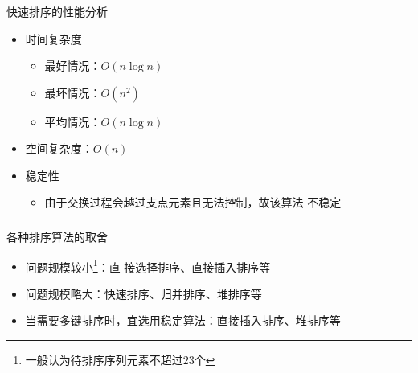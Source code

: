 \begin{frame}
    \frametitle{\insertsectionhead}
    \begin{block}{快速排序的性能分析}
        \begin{itemize}
            \item 时间复杂度
                  \begin{itemize}
                      \item 最好情况：$O(n\log n)$
                      \item 最坏情况：$O(n^{2})$
                      \item 平均情况：$O(n\log n)$
                  \end{itemize}
            \item 空间复杂度：$O(n)$
            \item 稳定性
                  \begin{itemize}
                      \item 由于交换过程会越过支点元素且无法控制，故该算法
                            \alert{不稳定}
                  \end{itemize}
        \end{itemize}
    \end{block}
\end{frame}

\begin{frame}
    \frametitle{\insertsectionhead}
    \begin{alertblock}{各种排序算法的取舍}
        \begin{itemize}
            \item 问题规模较小\footnote{一般认为待排序序列元素不超过$23$个}：直
                  接选择排序、直接插入排序等
            \item 问题规模略大：快速排序、归并排序、堆排序等
            \item 当需要多键排序时，宜选用稳定算法：直接插入排序、堆排序等
        \end{itemize}
    \end{alertblock}
\end{frame}